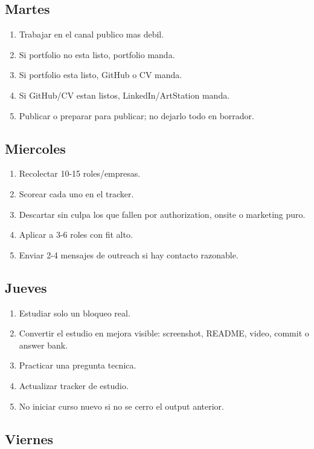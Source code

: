 \subsection{Martes}


\begin{enumerate}
\item Trabajar en el canal publico mas debil.
\item Si portfolio no esta listo, portfolio manda.
\item Si portfolio esta listo, GitHub o CV manda.
\item Si GitHub/CV estan listos, LinkedIn/ArtStation manda.
\item Publicar o preparar para publicar; no dejarlo todo en borrador.
\end{enumerate}


\subsection{Miercoles}


\begin{enumerate}
\item Recolectar 10-15 roles/empresas.
\item Scorear cada uno en el tracker.
\item Descartar sin culpa los que fallen por authorization, onsite o marketing puro.
\item Aplicar a 3-6 roles con fit alto.
\item Enviar 2-4 mensajes de outreach si hay contacto razonable.
\end{enumerate}


\subsection{Jueves}


\begin{enumerate}
\item Estudiar solo un bloqueo real.
\item Convertir el estudio en mejora visible: screenshot, README, video, commit o answer bank.
\item Practicar una pregunta tecnica.
\item Actualizar tracker de estudio.
\item No iniciar curso nuevo si no se cerro el output anterior.
\end{enumerate}


\subsection{Viernes}


